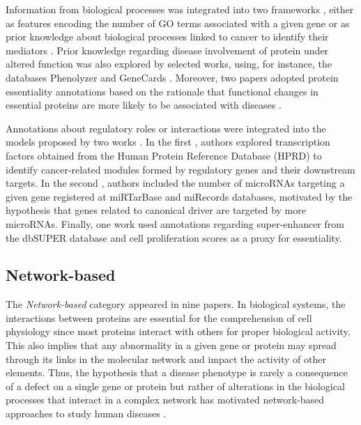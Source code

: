Information from biological processes was integrated into two frameworks \cite{Capriotti2011, Colaprico2020}, either as features encoding the number of GO terms associated with a given gene \cite{Capriotti2011} or as prior knowledge about biological processes linked to cancer to identify their mediators \cite{Colaprico2020}. Prior knowledge regarding disease involvement of protein under altered function was also explored by selected works, using, for instance, the databases Phenolyzer \cite{Dong2016} and GeneCards \cite{Zhou2018}. Moreover, two papers adopted protein essentiality annotations based on the rationale that functional changes in essential proteins are more likely to be associated with diseases \cite{Zhou2018,Nulsen2021}.

Annotations about regulatory roles or interactions were integrated into the models proposed by two works \cite{Manolakos2014, Nulsen2021}. In the first \cite{Manolakos2014}, authors explored transcription factors obtained from the Human Protein Reference Database (HPRD) \cite{vaquerizas2009census} to identify cancer-related modules formed by regulatory genes and their downstream targets. In the second \cite{Nulsen2021}, authors included the number of microRNAs targeting a given gene \cite{Nulsen2021} registered at miRTarBase \cite{chou2018mirtarbase} and miRecords \cite{xiao2009mirecords} databases, motivated by the hypothesis that genes related to canonical driver are targeted by more microRNAs. Finally, one work \cite{Lyu2020} used annotations regarding super-enhancer from the dbSUPER database \cite{khan2016dbsuper} and cell proliferation scores as a proxy for essentiality.

\subsection{Network-based}

The \textit{Network-based} category appeared in nine papers. In biological systems, the interactions between proteins are essential for the comprehension of cell physiology since most proteins interact with others for proper biological activity. This also implies that any abnormality in a given gene or protein may spread through its links in the molecular network and impact the activity of other elements. Thus, the hypothesis that a disease phenotype is rarely a consequence of a defect on a single gene or protein but rather of alterations in the biological processes that interact in a complex network has motivated network-based approaches to study human diseases \cite{barabasi2011network}.

